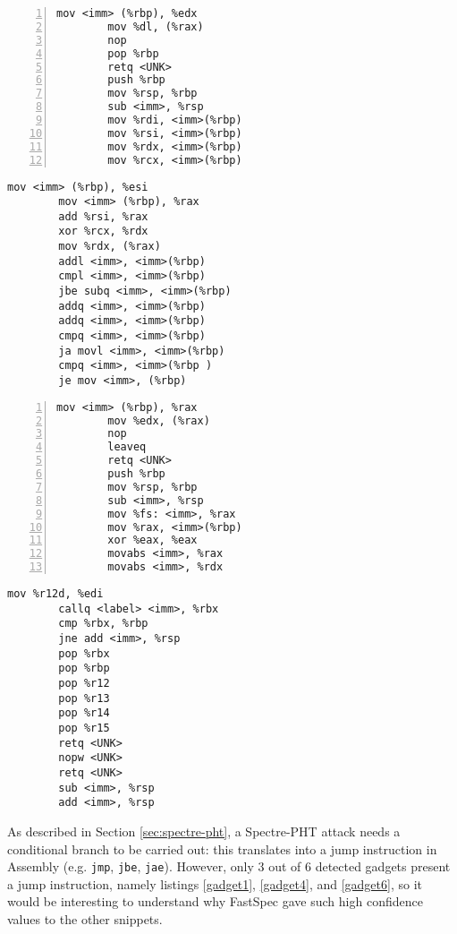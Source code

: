 \documentclass[target=mst,aauheader=aics]{thud}
\theoremstyle{definition}
\begin{document}
\begin{minipage}{.45\textwidth}
	\begin{lstlisting}[caption={Window 11024-11031}, label=gadget3, numbers=left]
		mov <imm> (%rbp), %edx
		mov %dl, (%rax)
		nop
		pop %rbp
		retq <UNK>
		push %rbp
		mov %rsp, %rbp
		sub <imm>, %rsp
		mov %rdi, <imm>(%rbp)
		mov %rsi, <imm>(%rbp)
		mov %rdx, <imm>(%rbp)
		mov %rcx, <imm>(%rbp)
	\end{lstlisting}
\end{minipage}\hfill
\begin{minipage}{.45\textwidth}
	\begin{lstlisting}[basicstyle=\footnotesize\ttfamily, caption={Window 11351-11392}, label=gadget4, numbers=right]
		mov <imm> (%rbp), %esi
		mov <imm> (%rbp), %rax
		add %rsi, %rax
		xor %rcx, %rdx
		mov %rdx, (%rax)
		addl <imm>, <imm>(%rbp)
		cmpl <imm>, <imm>(%rbp)
		jbe subq <imm>, <imm>(%rbp)
		addq <imm>, <imm>(%rbp)
		addq <imm>, <imm>(%rbp)
		cmpq <imm>, <imm>(%rbp)
		ja movl <imm>, <imm>(%rbp)
		cmpq <imm>, <imm>(%rbp )
		je mov <imm>, (%rbp)
	\end{lstlisting}
\end{minipage}

\begin{minipage}{.45\textwidth}
	\begin{lstlisting}[caption={Window 11598-11601}, label=gadget5, numbers=left]
		mov <imm> (%rbp), %rax
		mov %edx, (%rax)
		nop
		leaveq
		retq <UNK>
		push %rbp
		mov %rsp, %rbp
		sub <imm>, %rsp
		mov %fs: <imm>, %rax
		mov %rax, <imm>(%rbp)
		xor %eax, %eax
		movabs <imm>, %rax
		movabs <imm>, %rdx
	\end{lstlisting}
\end{minipage}\hfill
\begin{minipage}{.45\textwidth}
	\begin{lstlisting}[basicstyle=\footnotesize\ttfamily, caption={Window 11868-11902}, label=gadget6, numbers=right]
		mov %r12d, %edi
		callq <label> <imm>, %rbx
		cmp %rbx, %rbp
		jne add <imm>, %rsp
		pop %rbx
		pop %rbp
		pop %r12
		pop %r13
		pop %r14
		pop %r15
		retq <UNK>
		nopw <UNK>
		retq <UNK>
		sub <imm>, %rsp
		add <imm>, %rsp
	\end{lstlisting}
\end{minipage}
\vspace{3mm}

As described in Section \ref{sec:spectre-pht}, a Spectre-PHT attack needs a conditional branch to be carried out: this translates into a jump instruction in Assembly (e.g. \texttt{jmp}, \texttt{jbe}, \texttt{jae}). However, only 3 out of 6 detected gadgets present a jump instruction, namely listings \ref{gadget1}, \ref{gadget4}, and \ref{gadget6}, so it would be interesting to understand why FastSpec gave such high confidence values to the other snippets. 
\end{document}
